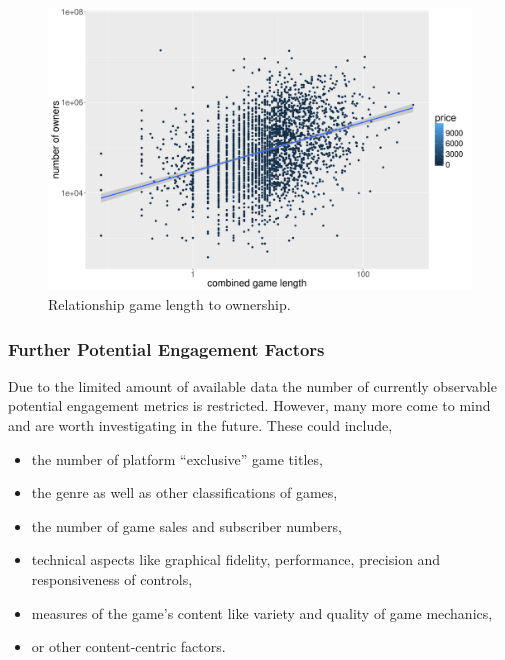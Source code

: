 \begin{figure}[!t]
	\centering
	\includegraphics[width=1.0\columnwidth]{images/rel-combinedlength-owners.pdf}
	\caption{Relationship game length to ownership.}
\label{fig:rel-combinedlength-owners}
\end{figure}


\subsubsection{Further Potential Engagement Factors}

Due to the limited amount of available data the number of currently observable potential engagement metrics is restricted. However, many more come to mind and are worth investigating in the future. These could include,

\begin{itemize}
	\item the number of platform ``exclusive'' game titles,
	\item the genre as well as other classifications of games,
	\item the number of game sales and subscriber numbers,
	\item technical aspects like graphical fidelity, performance, precision and responsiveness of controls,
	\item measures of the game's content like variety and quality of game mechanics,
	\item or other content-centric factors.
\end{itemize}





